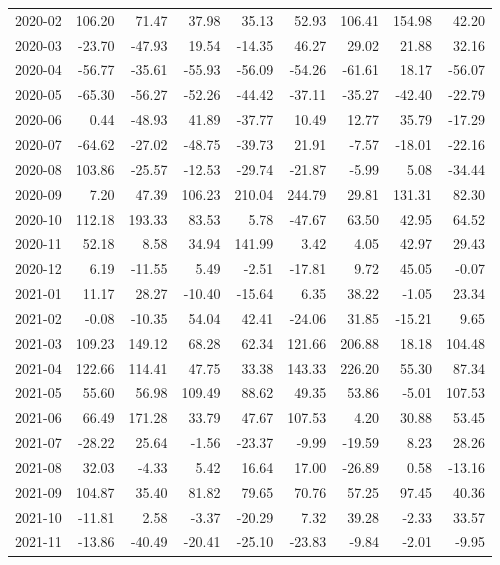 \begin{table}[ht]
\begin{tabular}{lrrrrrrrr}
  2020-02 & 106.20 & 71.47 & 37.98 & 35.13 & 52.93 & 106.41 & 154.98 & 42.20 \\ 
  2020-03 & -23.70 & -47.93 & 19.54 & -14.35 & 46.27 & 29.02 & 21.88 & 32.16 \\ 
  2020-04 & -56.77 & -35.61 & -55.93 & -56.09 & -54.26 & -61.61 & 18.17 & -56.07 \\ 
  2020-05 & -65.30 & -56.27 & -52.26 & -44.42 & -37.11 & -35.27 & -42.40 & -22.79 \\ 
  2020-06 & 0.44 & -48.93 & 41.89 & -37.77 & 10.49 & 12.77 & 35.79 & -17.29 \\ 
  2020-07 & -64.62 & -27.02 & -48.75 & -39.73 & 21.91 & -7.57 & -18.01 & -22.16 \\ 
  2020-08 & 103.86 & -25.57 & -12.53 & -29.74 & -21.87 & -5.99 & 5.08 & -34.44 \\ 
  2020-09 & 7.20 & 47.39 & 106.23 & 210.04 & 244.79 & 29.81 & 131.31 & 82.30 \\ 
  2020-10 & 112.18 & 193.33 & 83.53 & 5.78 & -47.67 & 63.50 & 42.95 & 64.52 \\ 
  2020-11 & 52.18 & 8.58 & 34.94 & 141.99 & 3.42 & 4.05 & 42.97 & 29.43 \\ 
  2020-12 & 6.19 & -11.55 & 5.49 & -2.51 & -17.81 & 9.72 & 45.05 & -0.07 \\ 
  2021-01 & 11.17 & 28.27 & -10.40 & -15.64 & 6.35 & 38.22 & -1.05 & 23.34 \\ 
  2021-02 & -0.08 & -10.35 & 54.04 & 42.41 & -24.06 & 31.85 & -15.21 & 9.65 \\ 
  2021-03 & 109.23 & 149.12 & 68.28 & 62.34 & 121.66 & 206.88 & 18.18 & 104.48 \\ 
  2021-04 & 122.66 & 114.41 & 47.75 & 33.38 & 143.33 & 226.20 & 55.30 & 87.34 \\ 
  2021-05 & 55.60 & 56.98 & 109.49 & 88.62 & 49.35 & 53.86 & -5.01 & 107.53 \\ 
  2021-06 & 66.49 & 171.28 & 33.79 & 47.67 & 107.53 & 4.20 & 30.88 & 53.45 \\ 
  2021-07 & -28.22 & 25.64 & -1.56 & -23.37 & -9.99 & -19.59 & 8.23 & 28.26 \\ 
  2021-08 & 32.03 & -4.33 & 5.42 & 16.64 & 17.00 & -26.89 & 0.58 & -13.16 \\ 
  2021-09 & 104.87 & 35.40 & 81.82 & 79.65 & 70.76 & 57.25 & 97.45 & 40.36 \\ 
  2021-10 & -11.81 & 2.58 & -3.37 & -20.29 & 7.32 & 39.28 & -2.33 & 33.57 \\ 
  2021-11 & -13.86 & -40.49 & -20.41 & -25.10 & -23.83 & -9.84 & -2.01 & -9.95 \\ 

\end{tabular}
\end{table}
